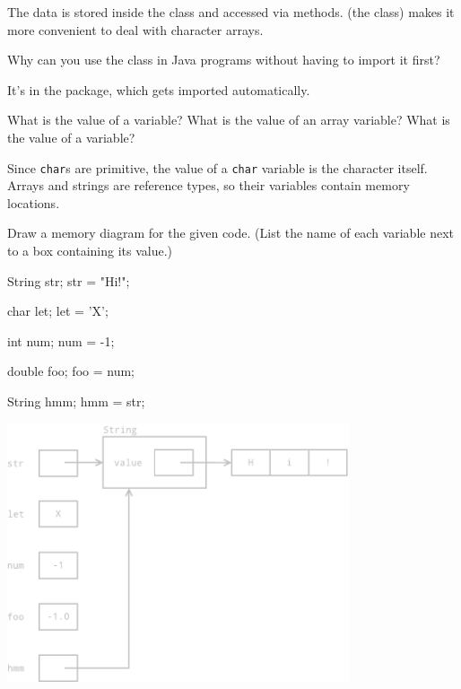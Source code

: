 \begin{answer}
The data is stored inside the class and accessed via methods.
 (the class) makes it more convenient to deal with character arrays.
\end{answer}


\Q Why can you use the  class in Java programs without having to import it first?

\begin{answer}
It's in the  package, which gets imported automatically.
\end{answer}


\Q What is the value of a  variable?
What is the value of an array variable?
What is the value of a  variable?

\begin{answer}
Since {\tt char}s are primitive, the value of a {\tt char} variable is the character itself.
Arrays and strings are reference types, so their variables contain memory locations.
\end{answer}


\Q Draw a memory diagram for the given code.
(List the name of each variable next to a box containing its value.)

\vspace{1ex}
\begin{javalst}
String str;
str = "Hi!";

char let;
let = 'X';

int num;
num = -1;

double foo;
foo = num;

String hmm;
hmm = str;
\end{javalst}

\vspace{-3.25in}
\begin{answer}[3.1in]
\hspace{2.2in}
\includegraphics[height=3in]{string2.pdf}
\end{answer}


